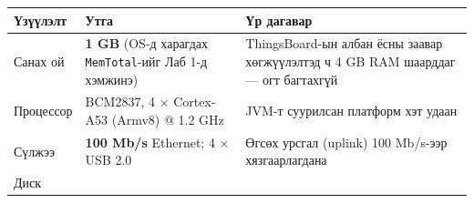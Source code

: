 \begingroup\scriptsize\begin{longtable}[]{@{}lll@{}}
\toprule
\begin{minipage}[b]{0.30\columnwidth}\raggedright
Үзүүлэлт\strut
\end{minipage} & \begin{minipage}[b]{0.30\columnwidth}\raggedright
Утга\strut
\end{minipage} & \begin{minipage}[b]{0.30\columnwidth}\raggedright
Үр дагавар\strut
\end{minipage}\tabularnewline
\midrule
\endhead
\begin{minipage}[t]{0.30\columnwidth}\raggedright
Санах ой\strut
\end{minipage} & \begin{minipage}[t]{0.30\columnwidth}\raggedright
\textbf{1 GB} (OS-д харагдах \texttt{MemTotal}-ийг Лаб 1-д хэмжинэ)\strut
\end{minipage} & \begin{minipage}[t]{0.30\columnwidth}\raggedright
ThingsBoard-ын албан ёсны заавар хөгжүүлэлтэд ч 4 GB RAM шаарддаг --- огт багтахгүй\strut
\end{minipage}\tabularnewline
\begin{minipage}[t]{0.30\columnwidth}\raggedright
Процессор\strut
\end{minipage} & \begin{minipage}[t]{0.30\columnwidth}\raggedright
BCM2837, 4 × Cortex-A53 (Armv8) @ 1.2 GHz\strut
\end{minipage} & \begin{minipage}[t]{0.30\columnwidth}\raggedright
JVM-т суурилсан платформ хэт удаан\strut
\end{minipage}\tabularnewline
\begin{minipage}[t]{0.30\columnwidth}\raggedright
Сүлжээ\strut
\end{minipage} & \begin{minipage}[t]{0.30\columnwidth}\raggedright
\textbf{100 Mb/s} Ethernet; 4 × USB 2.0\strut
\end{minipage} & \begin{minipage}[t]{0.30\columnwidth}\raggedright
Өгсөх урсгал (uplink) 100 Mb/s-ээр хязгаарлагдана\strut
\end{minipage}\tabularnewline
\begin{minipage}[t]{0.30\columnwidth}\raggedright
Диск\strut
\end{minipage} & \begin{minipage}[t]{0.30\columnwidth}\raggedright

\end{minipage}
\end{longtable}
